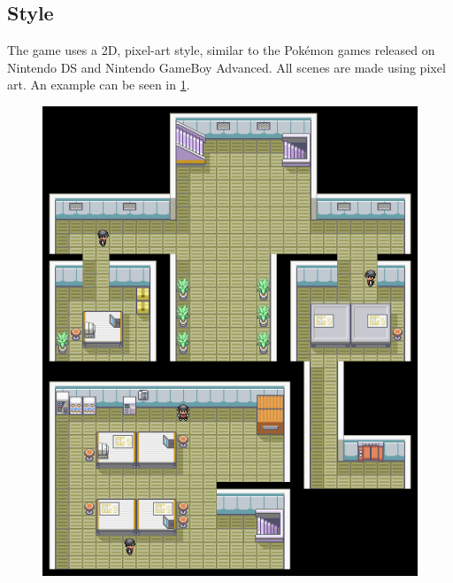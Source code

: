 \documentclass[a4paper,10pt,english]{article}
\begin{document}
\subsection*{Style}
The game uses a 2D, pixel-art style, similar to the Pokémon games released on Nintendo DS and Nintendo GameBoy Advanced. All scenes are made using pixel art. An example can be seen in   \ref{Fig:Style1A}.

\begin{figure}[h]

\centering
\includegraphics[width=\linewidth]{Kanto_Rocket_Hideout_F1_Map_24bpp.png}
\label{Fig:Style1A}

\end{figure} 
\end{document}
